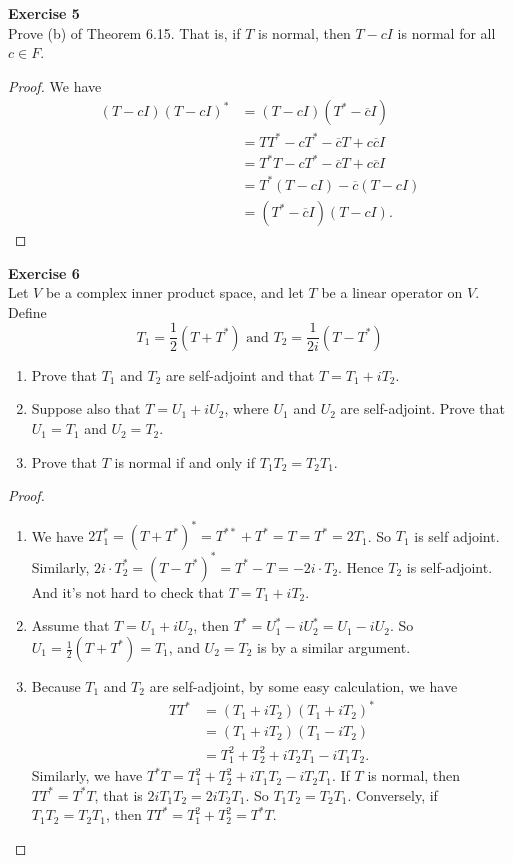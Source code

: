 \documentclass[12pt, a4paper]{article}
\theoremstyle{plain}
\newenvironment{exercise}[2][Exercise]
    { \begin{mdframed}[backgroundcolor=gray!20] \textbf{#1 #2} \\}
    {  \end{mdframed}}
\begin{document}
\begin{exercise}{5}
Prove (b) of Theorem 6.15. That is, if $T$ is normal, then $T-cI$ is normal for all $c\in F$.
\end{exercise}
	\begin{proof}
	We have 
	\begin{align*}
	(T-cI)(T-cI)^*&=(T-cI)(T^*-\overline{c}I)\\
	&=TT^*-cT^*-\overline{c}T + c\overline{c}I\\
	&= T^*T-cT^*-\overline{c}T + c\overline{c}I\\
	&=T^*(T-cI)-\overline{c}(T-cI)\\
	&=(T^*-\overline{c}I)(T-cI).
	\end{align*}
	\end{proof}

\begin{exercise}{6}
Let $V$ be a complex inner product space, and let $T$ be a linear operator on $V$. Define
\[
T_1=\frac{1}{2}(T+T^*) \text{ and } T_2=\frac{1}{2i}(T-T^*)
\]
\begin{enumerate}[label=(\alph*)]
\item Prove that $T_1$ and $T_2$ are self-adjoint and that $T=T_1+iT_2$.
\item Suppose also that $T=U_1+iU_2$, where $U_1$ and $U_2$ are self-adjoint. Prove that $U_1=T_1$ and $U_2=T_2$.
\item Prove that $T$ is normal if and only if $T_1T_2=T_2T_1$.
\end{enumerate}
\end{exercise}
	\begin{proof}
	\hfill
	\begin{enumerate}[label=(\alph*)]
	\item We have $2T_1^* = (T+T^*)^* = T^{**}+T^* = T=T^* =2T_1$. So $T_1$ is self adjoint. Similarly, $2i\cdot T_2^*=(T-T^*)^*=T^*-T=-2i\cdot T_2$. Hence $T_2$ is self-adjoint. And it's not hard to check that $T=T_1+iT_2$.
	\item Assume that $T=U_1+iU_2$, then $T^*=U_1^*-iU^*_2=U_1-iU_2$. So $U_1 = \frac{1}{2}(T+T^*) = T_1$, and $U_2=T_2$ is by a similar argument.
	\item Because $T_1$ and $T_2$ are self-adjoint, by some easy calculation, we have
	\begin{align*}
	TT^* &= (T_1+iT_2)(T_1+iT_2)^*\\
	&=(T_1+iT_2)(T_1-iT_2)\\
	&= T_1^2+T_2^2+iT_2T_1 - iT_1T_2.
	\end{align*}
	Similarly, we have $T^*T=T_1^2+T_2^2+iT_1T_2-iT_2T_1$. If $T$ is normal, then $TT^*=T^*T$, that is $2iT_1T_2 = 2iT_2T_1$. So $T_1T_2 = T_2T_1$. Conversely, if $T_1T_2 = T_2T_1$, then $TT^*=T_1^2+T_2^2=T^*T$.
	\end{enumerate}
	\end{proof}
	
\end{document}
